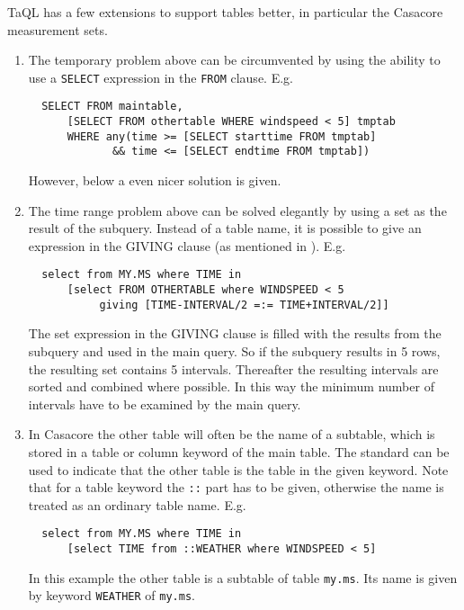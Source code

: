 TaQL has a few extensions to support tables better,
in particular the Casacore measurement sets.
\begin{enumerate}
\item
The temporary problem above can be circumvented by using the
ability to use a \texttt{SELECT} expression in the \texttt{FROM}
clause. E.g.
\begin{verbatim}
  SELECT FROM maintable,
      [SELECT FROM othertable WHERE windspeed < 5] tmptab
      WHERE any(time >= [SELECT starttime FROM tmptab]
             && time <= [SELECT endtime FROM tmptab])
\end{verbatim}
However, below a even nicer solution is given. 

\item
The time range problem above can be solved elegantly by using
a set as the result of the subquery. Instead of a table name,
it is possible to give an expression in the GIVING clause (as mentioned
in ). E.g.
\begin{verbatim}
  select from MY.MS where TIME in
      [select FROM OTHERTABLE where WINDSPEED < 5
           giving [TIME-INTERVAL/2 =:= TIME+INTERVAL/2]]
\end{verbatim}
The set expression in the GIVING clause is filled with the
results from the subquery and used in the main query. So if
the subquery results in 5 rows, the resulting set contains 5
intervals. Thereafter the resulting intervals are sorted and combined
where possible. In this way the minimum number of intervals have to be
examined by the main query.

\item
In Casacore the other table will often be the name of a subtable,
which is stored in a table or column keyword of the main table.
The standard  can be used
to indicate that the other table is the table in the given keyword.
Note that for a table keyword the \texttt{::} part has to be given,
otherwise the name is treated as an ordinary table name. E.g.
\begin{verbatim}
  select from MY.MS where TIME in
      [select TIME from ::WEATHER where WINDSPEED < 5]
\end{verbatim}
In this example the other table is a subtable of table \texttt{my.ms}.
Its name is given by keyword \texttt{WEATHER} of \texttt{my.ms}.


\end{enumerate}
